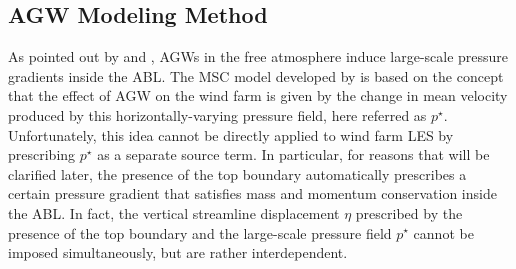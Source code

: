 \subsection{AGW Modeling Method}
\label{subsec:agwModelingMethod}
As pointed out by \cite{AllaertsMayers2017a,AllaertsMayers2017b,AllaertsMeyers2019} and \cite{LanzilaoMeyers2022b}, AGWs in the free atmosphere induce large-scale pressure gradients inside the ABL. The MSC model developed by \cite{StipaEtAl2023b} is based on the concept that the effect of AGW on the wind farm is given by the change in mean velocity produced by this horizontally-varying pressure field, here referred as $p^\star$. Unfortunately, this idea cannot be directly applied to wind farm LES by prescribing $p^\star$ as a separate source term. In particular, for reasons that will be clarified later, the presence of the top boundary automatically prescribes a certain pressure gradient that satisfies mass and momentum conservation inside the ABL. In fact, the vertical streamline displacement $\eta$ prescribed by the presence of the top boundary and the large-scale pressure field $p^\star$ cannot be imposed simultaneously, but are rather interdependent.


